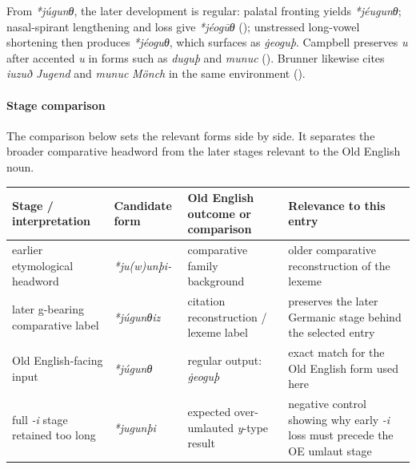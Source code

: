 \documentclass[
  british,
  a4paper,
]{article}
\newcounter{none} %
\begin{document}
From \emph{*júgunθ}, the later development is regular: palatal fronting
yields \emph{*jéugunθ}; nasal-spirant lengthening and loss give
\emph{*jéogūθ} (); unstressed
long-vowel shortening then produces \emph{*jéoguθ}, which surfaces as
\emph{ġeoguþ}. Campbell preserves \emph{u} after accented \emph{u} in
forms such as \emph{duguþ} and \emph{munuc}
(). Brunner
likewise cites \emph{iuzuð} \emph{Jugend} and \emph{munuc} \emph{Mönch}
in the same environment ().

\paragraph{Stage comparison}\label{stage-comparison-4}

The comparison below sets the relevant forms side by side. It separates
the broader comparative headword from the later stages relevant to the
Old English noun.

{\def\LTcaptype{none} %
\begin{longtable}[]{@{}
  >{\raggedright\arraybackslash}p{}
  >{\raggedright\arraybackslash}p{}
  >{\raggedright\arraybackslash}p{}
  >{\raggedright\arraybackslash}p{}@{}}
\toprule\noalign{}
\begin{minipage}[b]{\linewidth}\raggedright
Stage / interpretation
\end{minipage} & \begin{minipage}[b]{\linewidth}\raggedright
Candidate form
\end{minipage} & \begin{minipage}[b]{\linewidth}\raggedright
Old English outcome or comparison
\end{minipage} & \begin{minipage}[b]{\linewidth}\raggedright
Relevance to this entry
\end{minipage} \\
\midrule\noalign{}
\endhead
\bottomrule\noalign{}
\endlastfoot
earlier etymological headword & \emph{*ju(w)unþi-} & comparative family
background & older comparative reconstruction of the lexeme \\
later g-bearing comparative label & \emph{*júgunθiz} & citation
reconstruction / lexeme label & preserves the later Germanic stage
behind the selected entry \\
Old English-facing input & \emph{*júgunθ} & regular output:
\emph{ġeoguþ} & exact match for the Old English form used here \\
full \emph{-i} stage retained too long & \emph{*jugunþi} & expected
over-umlauted \emph{y}-type result & negative control showing why early
\emph{-i} loss must precede the OE umlaut stage \\
\end{longtable}
}
\end{document}
